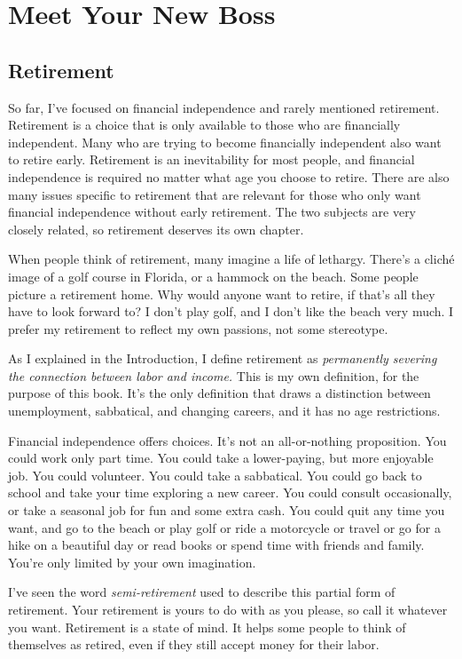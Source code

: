 \chapter{Meet Your New Boss}

\section{Retirement}
So far, I've focused on financial independence and rarely mentioned retirement. Retirement is a choice that is only available to those who are financially independent. Many who are trying to become financially independent also want to retire early. Retirement is an inevitability for most people, and financial independence is required no matter what age you choose to retire. There are also many issues specific to retirement that are relevant for those who only want financial independence without early retirement. The two subjects are very closely related, so retirement deserves its own chapter.

When people think of retirement, many imagine a life of lethargy. There's a clich\'e image of a golf course in Florida, or a hammock on the beach. Some people picture a retirement home. Why would anyone want to retire, if that's all they have to look forward to? I don't play golf, and I don't like the beach very much. I prefer my retirement to reflect my own passions, not some stereotype.

As I explained in the Introduction, I define retirement as \emph{permanently severing the connection between labor and income.} This is my own definition, for the purpose of this book. It's the only definition that draws a distinction between unemployment, sabbatical, and changing careers, and it has no age restrictions.

Financial independence offers choices. It's not an all-or-nothing proposition. You could work only part time. You could take a lower-paying, but more enjoyable job. You could volunteer. You could take a sabbatical. You could go back to school and take your time exploring a new career. You could consult occasionally, or take a seasonal job for fun and some extra cash. You could quit any time you want, and go to the beach or play golf or ride a motorcycle or travel or go for a hike on a beautiful day or read books or spend time with friends and family. You're only limited by your own imagination.

I've seen the word \emph{semi-retirement} used to describe this partial form of retirement. Your retirement is yours to do with as you please, so call it whatever you want. Retirement is a state of mind. It helps some people to think of themselves as retired, even if they still accept money for their labor. 

